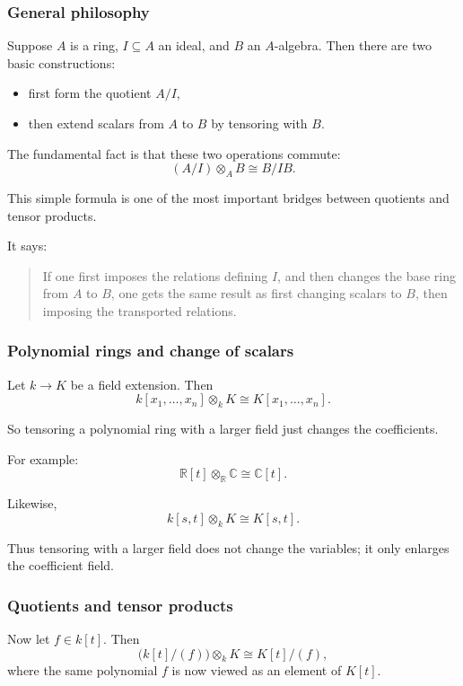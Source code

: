\documentclass[12pt,a4paper]{article}
\theoremstyle{notespace}
\theoremstyle{definition}
\begin{document}
\subsubsection{General philosophy}

Suppose \(A\) is a ring, \(I\subseteq A\) an ideal, and \(B\) an \(A\)-algebra.  
Then there are two basic constructions:

\begin{itemize}
	\item first form the quotient \(A/I\),
	\item then extend scalars from \(A\) to \(B\) by tensoring with \(B\).
\end{itemize}

The fundamental fact is that these two operations commute:
\[
(A/I)\otimes_A B \cong B/IB.
\]

This simple formula is one of the most important bridges between quotients and tensor products.

It says:

\begin{quote}
	If one first imposes the relations defining \(I\), and then changes the base ring from \(A\) to \(B\), one gets the same result as first changing scalars to \(B\), then imposing the transported relations.
\end{quote}

\subsubsection{Polynomial rings and change of scalars}

Let \(k\to K\) be a field extension. Then
\[
k[x_1,\dots,x_n]\otimes_k K \cong K[x_1,\dots,x_n].
\]

So tensoring a polynomial ring with a larger field just changes the coefficients.

For example:
\[
\mathbb{R}[t]\otimes_{\mathbb{R}} \mathbb{C}\cong \mathbb{C}[t].
\]

Likewise,
\[
k[s,t]\otimes_k K\cong K[s,t].
\]

Thus tensoring with a larger field does not change the variables; it only enlarges the coefficient field.

\subsubsection{Quotients and tensor products}

Now let \(f\in k[t]\). Then
\[
\bigl(k[t]/(f)\bigr)\otimes_k K
\cong
K[t]/(f),
\]
where the same polynomial \(f\) is now viewed as an element of \(K[t]\).
\end{document}
